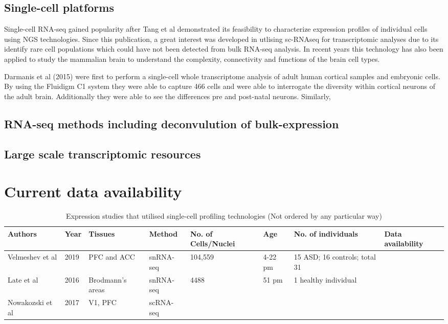 \documentclass[12pt]{article}
\begin{document}
\subsection{Single-cell platforms}
Single-cell RNA-seq gained popularity after Tang et al demonstrated its feasibility to characterize expression profiles of individual cells using NGS technologies. Since this publication, a great interest was developed in utlising sc-RNAseq for transcriptomic analyses due to its identify rare cell populations which could have not been detected from bulk RNA-seq analysis.  In recent years this technology has also been applied to study the mammalian brain to understand the complexity, connectivity and functions of the brain cell types. 

Darmanis et al (2015) were first to perform a single-cell whole transcriptome analysis of adult human cortical samples and embryonic cells. By using the Fluidigm C1 system they were able to capture 466 cells and were able to interrogate the diversity within cortical neurons of the adult brain. Additionally they were able to see the differences pre and post-natal neurons. Similarly, 

 

\subsection{RNA-seq methods including deconvulution of bulk-expression}

\subsection{Large scale transcriptomic resources}



\section{Current data availability}

\begin{landscape}
	\begin{table}[!htp]
		\centering
		\footnotesize
		\caption{Expression studies that utilised single-cell profiling technologies (Not ordered by any particular way)}
		\begin{tabular}{|l|l|l|l|l|l|l|l|}
			\hline
			\textbf{Authors} &\textbf{Year}  & \textbf{Tissues} & \textbf{Method} & \textbf{No. of Cells/Nuclei}  & \textbf{Age} &  \textbf{No. of individuals} & \textbf{Data availability}  \\ \hline
			Velmeshev et al & 2019  &  PFC and ACC  & snRNA-seq  & 104,559 & 4-22 pm &15 ASD; 16 controls; total 31&  \\ \hline
			Late et al& 2016  & Brodmann's areas  & snRNA-seq & 4488 &51 pm & 1 healthy individual &  \\ \hline
			Nowakozski et al & 2017 &V1, PFC & scRNA-seq     & &&& \\ \hline
		\end{tabular}
	\end{table}
\end{landscape}
\end{document}
